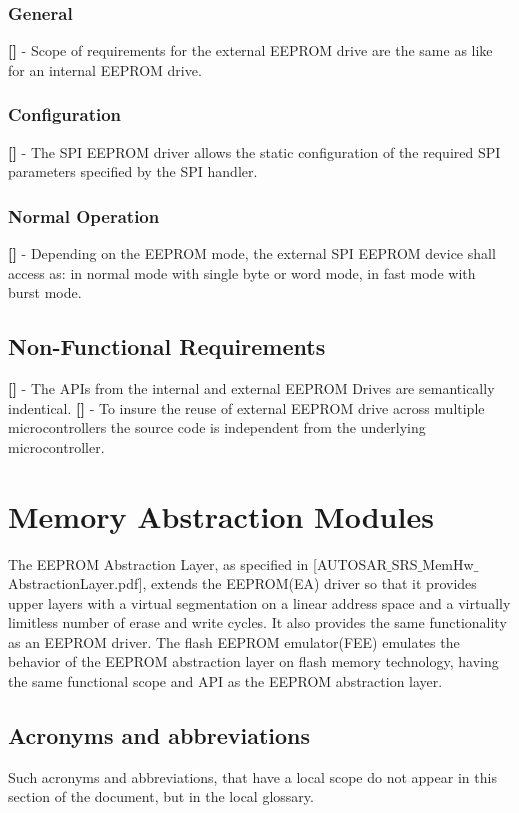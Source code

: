 \subsubsection{General}
{\bf []} - Scope of requirements for the external EEPROM drive are the same as like for an internal EEPROM drive.
\subsubsection{Configuration}
{\bf []} - The SPI EEPROM driver allows the static configuration of the required SPI parameters specified by the \mbox{SPI} handler.
\subsubsection{Normal Operation}
{\bf []} - Depending on the EEPROM mode, the external SPI EEPROM device shall access as: in normal mode with single byte or word mode, in fast mode with burst mode.
\subsection{Non-Functional Requirements}
{\bf []} - The APIs from the internal and external EEPROM Drives are semantically indentical.\newline
\newline
{\bf []} - To insure the reuse of external EEPROM drive across multiple microcontrollers the source code is independent from the underlying microcontroller.

\newpage
\section{Memory Abstraction Modules}
The EEPROM Abstraction Layer, as specified in  [AUTOSAR$\_$SRS$\_$MemHw$\_$AbstractionLayer.pdf],  extends the EEPROM(EA) driver  so that it provides upper layers with a virtual segmentation on a linear address space and a virtually limitless number of erase and write cycles. It also provides the same functionality as an \mbox{EEPROM} driver.\newline
The flash EEPROM emulator(FEE) emulates the behavior of the EEPROM abstraction layer on flash memory technology, having the same functional scope and API as the EEPROM abstraction layer.\newline
\subsection{Acronyms and abbreviations}
Such acronyms and abbreviations, that have a local scope do not appear in this section of the document, but in the local glossary.
